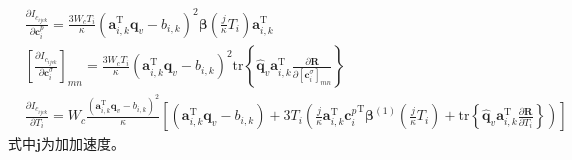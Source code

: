\begin{align}
  & \frac{\partial I_{c_{ijvk}}}{\partial \bm{c}_i^{p}} = 
  \frac{3W_cT_i}{\kappa} (\bm{a}_{i,k}^{\text{T}}\bm{q}_v - b_{i,k})^2 \bm{\beta}(\frac{j}{\kappa}T_i)\bm{a}_{i,k}^{\text{T}}
  \label{equ:Ecdcp} \\
  & \left[\frac{\partial I_{c_{ijvk}}}{\partial \bm{c}_i^{\sigma}}\right]_{mn} = 
  \frac{3W_cT_i}{\kappa} (\bm{a}_{i,k}^{\text{T}}\bm{q}_v - b_{i,k})^2 \mathrm{tr}\left\{\hat{\bm{q}}_v\bm{a}_{i,k}^{\text{T}}\frac{\partial \bm{R}}{\partial [\bm{c}_i^{\sigma}]_{mn}}\right\}
  \label{equ:Ecdcp} \\
  & \frac{\partial I_{c_{ijvk}}}{\partial T_i} = 
  W_c \frac{(\bm{a}_{i,k}^{\text{T}}\bm{q}_v - b_{i,k})^2}{\kappa} \left[(\bm{a}_{i,k}^{\text{T}}\bm{q}_v - b_{i,k}) + 3T_i\left(\frac{j}{\kappa}\bm{a}_{i,k}^{\text{T}}{\bm{c}_i^{p}}^{\text{T}}\bm{\beta}^{(1)}(\frac{j}{\kappa}T_i)+\mathrm{tr}\left\{\hat{\bm{q}}_v\bm{a}_{i,k}^{\text{T}}\frac{\partial \bm{R}}{\partial T_i}\right\}\right)\right]
  \label{equ:EcdT}
\end{align}
式中$\bm{j}$为加加速度。